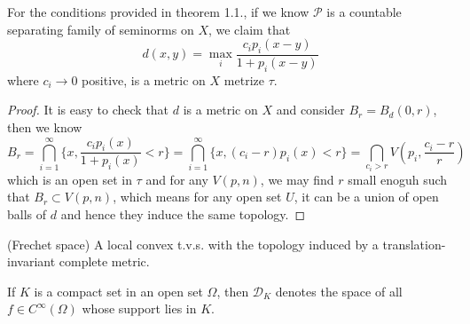 \documentclass[lang=en, color=blue, ]{elegantbook}
\newcommand{\D}{\mathscr{D}}
\begin{document}
\begin{theorem}
    For the conditions provided in theorem 1.1., if we know $\mathcal{P}$ is a countable separating family of seminorms on $X$, we claim that
    \[
    d(x,y) = \max_{i} \dfrac{c_ip_i(x-y)}{1+p_i(x-y)}
    \]
    where $c_i \to 0$ positive, is a metric on $X$ metrize $\tau$.
\end{theorem}
\begin{proof}
    It is easy to check that $d$ is a metric on $X$ and consider $B_r = B_d(0,r)$, then we know
    \[
    B_r = \bigcap_{i=1}^{\infty} \{x, \dfrac{c_ip_i(x)}{1+p_i(x)} < r\} =  \bigcap_{i=1}^{\infty} \{x, (c_i-r)p_i(x) < r\} = \bigcap_{c_i >r} V(p_i,\dfrac{c_i-r}{r})
    \]
    which is an open set in $\tau$ and for any $V(p,n)$, we may find $r$ small enoguh such that $B_r \subset V(p,n)$, which means for any open set $U$, it can be a union of open balls of $d$ and hence they induce the same topology.
\end{proof}


\begin{definition}
    (Frechet space) A local convex t.v.s. with the topology induced by a translation-invariant complete metric.
\end{definition}

\begin{definition}
    If $K$ is a compact set in an open set $\Omega$, then $\D_K$ denotes the space of all $f\in C^{\infty}(\Omega)$ whose support lies in $K$.  
\end{definition}
\end{document}
